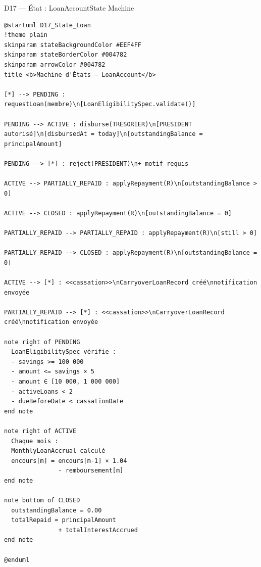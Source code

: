\documentclass[12pt, a4paper]{report}
\begin{document}
\begin{diagramBox}{D17 — État : LoanAccount}{State Machine}
\begin{lstlisting}
@startuml D17_State_Loan
!theme plain
skinparam stateBackgroundColor #EEF4FF
skinparam stateBorderColor #004782
skinparam arrowColor #004782
title <b>Machine d'États — LoanAccount</b>

[*] --> PENDING : requestLoan(membre)\n[LoanEligibilitySpec.validate()]

PENDING --> ACTIVE : disburse(TRESORIER)\n[PRESIDENT autorisé]\n[disbursedAt = today]\n[outstandingBalance = principalAmount]

PENDING --> [*] : reject(PRESIDENT)\n+ motif requis

ACTIVE --> PARTIALLY_REPAID : applyRepayment(R)\n[outstandingBalance > 0]

ACTIVE --> CLOSED : applyRepayment(R)\n[outstandingBalance = 0]

PARTIALLY_REPAID --> PARTIALLY_REPAID : applyRepayment(R)\n[still > 0]

PARTIALLY_REPAID --> CLOSED : applyRepayment(R)\n[outstandingBalance = 0]

ACTIVE --> [*] : <<cassation>>\nCarryoverLoanRecord créé\nnotification envoyée

PARTIALLY_REPAID --> [*] : <<cassation>>\nCarryoverLoanRecord créé\nnotification envoyée

note right of PENDING
  LoanEligibilitySpec vérifie :
  - savings >= 100 000
  - amount <= savings × 5
  - amount ∈ [10 000, 1 000 000]
  - activeLoans < 2
  - dueBeforeDate < cassationDate
end note

note right of ACTIVE
  Chaque mois :
  MonthlyLoanAccrual calculé
  encours[m] = encours[m-1] × 1.04
               - remboursement[m]
end note

note bottom of CLOSED
  outstandingBalance = 0.00
  totalRepaid = principalAmount
               + totalInterestAccrued
end note

@enduml
\end{lstlisting}
\end{diagramBox}
\end{document}
